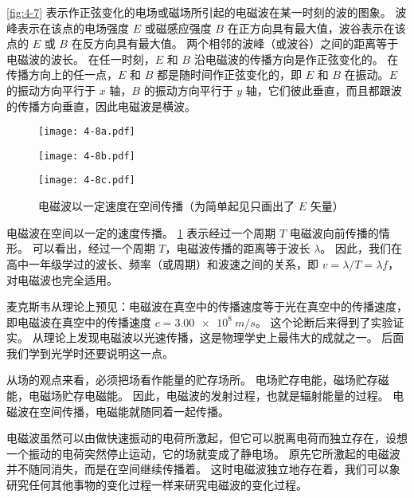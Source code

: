 \cref{fig:4-7} 表示作正弦变化的电场或磁场所引起的电磁波在某一时刻的波的图象。
波峰表示在该点的电场强度 $E$ 或磁感应强度 $B$ 在正方向具有最大值，波谷表示在该点的 $E$ 或 $B$ 在反方向具有最大值。
两个相邻的波峰（或波谷）之间的距离等于电磁波的波长。
在任一时刻，$E$ 和 $B$ 沿电磁波的传播方向是作正弦变化的。
在传播方向上的任一点，$E$ 和 $B$ 都是随时间作正弦变化的，即 $E$ 和 $B$ 在振动。$E$ 的振动方向平行于 $x$ 轴，$B$ 的振动方向平行于 $y$ 轴，它们彼此垂直，而且都跟波的传播方向垂直，因此电磁波是横波。
\begin{figure}
	\begin{minipage}{0.1\linewidth}\raggedleft
	  \subcaption{}\label{fig:4-8a}
	\end{minipage}%
	\begin{minipage}{0.9\linewidth}
	  \texttt{[image: 4-8a.pdf]}
	\end{minipage}
	\begin{minipage}{0.1\linewidth}\raggedleft
	  \subcaption{}\label{fig:4-8b}
	\end{minipage}%
	\begin{minipage}{0.9\linewidth}
	  \texttt{[image: 4-8b.pdf]}
	\end{minipage}
	\begin{minipage}{0.1\linewidth}\raggedleft
	  \subcaption{}\label{fig:4-8c}
	\end{minipage}%
	\begin{minipage}{0.9\linewidth}
	  \texttt{[image: 4-8c.pdf]}
	\end{minipage}
	\caption{电磁波以一定速度在空间传播（为简单起见只画出了 $E$ 矢量）}\label{fig:4-8}
\end{figure}

电磁波在空间以一定的速度传播。
\cref{fig:4-8} 表示经过一个周期 $T$ 电磁波向前传播的情形。
可以看出，经过一个周期 $T$，电磁波传播的距离等于波长 $\lambda$。
因此，我们在高中一年级学过的波长、频率（或周期）和波速之间的关系，即 $v=\lambda/T=\lambda f$，对电磁波也完全适用。

麦克斯韦从理论上预见：电磁波在真空中的传播速度等于光在真空中的传播速度，即电磁波在真空中的传播速度 $c=\qty{3.00e8}{m/s}$。
这个论断后来得到了实验证实。
从理论上发现电磁波以光速传播，这是物理学史上最伟大的成就之一。
后面我们学到光学时还要说明这一点。

从场的观点来看，必须把场看作能量的贮存场所。
电场贮存电能，磁场贮存磁能，电磁场贮存电磁能。
因此，电磁波的发射过程，也就是辐射能量的过程。
电磁波在空间传播，电磁能就随同着一起传播。

电磁波虽然可以由做快速振动的电荷所激起，但它可以脱离电荷而独立存在，设想一个振动的电荷突然停止运动，它的场就变成了静电场。
原先它所激起的电磁波并不随同消失，而是在空间继续传播着。
这时电磁波独立地存在着，我们可以象研究任何其他事物的变化过程一样来研究电磁波的变化过程。

